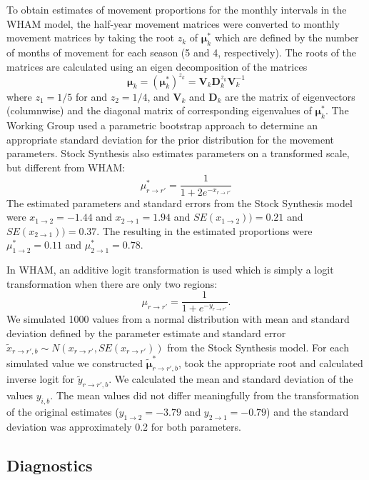 \documentclass[
]{article}
\begin{document}
To obtain estimates of movement proportions for the monthly intervals in
the WHAM model, the half-year movement matrices were converted to
monthly movement matrices by taking the root \(z_k\) of
\(\boldsymbol{\mu}^*_{k}\) which are defined by the number of months of
movement for each season (5 and 4, respectively). The roots of the
matrices are calculated using an eigen decomposition of the matrices
\[ \boldsymbol{\mu}_k =  \left(\boldsymbol{\mu}_k^*\right)^{z_k} = \mathbf{V}_k \mathbf{D}_k^{z_k} \mathbf{V}_k^{-1}\]
where \(z_1 = 1/5\) for and \(z_2 = 1/4\), and \(\mathbf{V}_{k}\) and
\(\mathbf{D}_{k}\) are the matrix of eigenvectors (columnwise) and the
diagonal matrix of corresponding eigenvalues of
\(\boldsymbol{\mu}^*_k\). The Working Group used a parametric bootstrap
approach to determine an appropriate standard deviation for the prior
distribution for the movement parameters. Stock Synthesis also estimates
parameters on a transformed scale, but different from WHAM:
\[\mu^*_{r\rightarrow r'} = \frac{1}{1 + 2e^{-x_{r\rightarrow r'}}}\]
The estimated parameters and standard errors from the Stock Synthesis
model were \(x_{1\rightarrow 2}=-1.44\) and \(x_{2\rightarrow 1}=1.94\)
and \(SE(x_{1\rightarrow 2})) = 0.21\) and
\(SE(x_{2\rightarrow 1})) = 0.37\). The resulting in the estimated
proportions were \(\mu^*_{1\rightarrow 2}=0.11\) and
\(\mu^*_{2\rightarrow 1}=0.78\).

In WHAM, an additive logit transformation is used which is simply a
logit transformation when there are only two regions: \[
\mu_{r\rightarrow r'} = \frac{1}{1+e^{-y_{r\rightarrow r'}}}.
\] We simulated 1000 values from a normal distribution with mean and
standard deviation defined by the parameter estimate and standard error
\(\tilde x_{{r\rightarrow r'},b} \sim N(x_{r\rightarrow r'}, SE(x_{r\rightarrow r'}))\)
from the Stock Synthesis model. For each simulated value we constructed
\(\tilde {\boldsymbol{\mu}}^*_{{r\rightarrow r'},b}\), took the
appropriate root and calculated inverse logit for
\(\tilde y_{{r\rightarrow r'},b}\). We calculated the mean and standard
deviation of the values \(y_{i,b}\). The mean values did not differ
meaningfully from the transformation of the original estimates
(\(y_{1\rightarrow 2} = -3.79\) and \(y_{2\rightarrow 1} = -0.79\)) and
the standard deviation was approximately 0.2 for both parameters.

\hypertarget{diagnostics}{%
\subsection*{Diagnostics}\label{diagnostics}}
\end{document}

